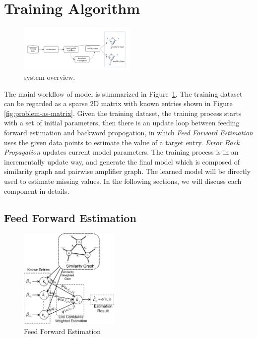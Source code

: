 \section{Training Algorithm}
\label{sec:trainer}

\begin{figure}[!ht]
  \centering
  \includegraphics[width=0.5\textwidth]{figures/new_model.png}
  \caption{{\sppan} system overview.}
  \label{fig:model}
\end{figure}

The mainl workflow of {\sppan} model is summarized in
Figure~\ref{fig:model}.  The training dataset can be regarded as a
sparse 2D matrix with known entries shown in Figure
\ref{fig:problem-as-matrix}.  Given the training dataset, the training
process starts with a set of initial parameters, then there is an
update loop between feeding forward estimation and backword
propogation, in which {\it Feed Forward Estimation} uses the given
data points to estimate the value of a target entry.  {\it Error Back
  Propagation} updates current model parameters.  The training process
is in an incrementally update way, and generate the final model which
is composed of similarity graph and pairwise amplifier graph. The
learned {\sppan} model will be directly used to estimate missing
values.  In the following sections, we will discuss each component in
details.

\subsection{Feed Forward Estimation}
\label{sec:ffe}

\begin{figure}[!ht]
  \centering
  \includegraphics[width=0.43\textwidth]{figures/trainer_feedforward.pdf}
  \caption{Feed Forward Estimation}
  \label{fig:trainer-feedforward}
\end{figure}

